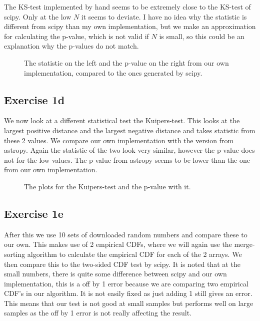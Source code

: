  The KS-test implemented by hand seems to be extremely close to the KS-test of scipy. Only at the low $N$ it seems to deviate. I have no idea why the statistic is different from scipy than my own implementation, but we make an approximation for calculating the p-value, which is not valid if $N$ is small, so this could be an explanation why the p-values do not match.
  \begin{figure} %
	\centering
    \qquad
  \caption{The statistic on the left and the p-value on the right from our own implementation, compared to the ones generated by scipy.}
\end{figure}

  \subsection{Exercise 1d}
  
  We now look at a different statistical test the Kuipers-test. This looks at the largest positive distance and the largest negative distance and takes statistic from these 2 values. We compare our own implementation with the version from astropy. Again the statistic of the two look very similar, however the p-value does not for the low values. The p-value from astropy seems to be lower than the one from our own implementation.
  
  \begin{figure}
    \centering
    \qquad
    \caption{The plots for the Kuipers-test and the p-value with it.}
    \label{fig:example}%
 
  \end{figure}


\subsection{Exercise 1e}
After this we use 10 sets of downloaded random numbers and compare these to our own. This makes use of 2 empirical CDFs, where we will again use the merge-sorting algorithm to calculate the empirical CDF for each of the 2 arrays. We then compare this to the two-sided CDF test by scipy. It is noted that at the small numbers, there is quite some difference between scipy and our own implementation, this is a off by 1 error because we are comparing two empirical CDF's in our algorithm. It is not easily fixed as just adding 1 still gives an error. This means that our test is not good at small samples but performs well on large samples as the off by 1 error is not really affecting the result.

